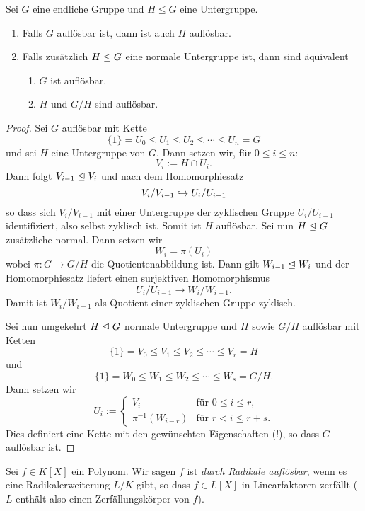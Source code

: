\documentclass{book}
\begin{document}
\begin{lem}
    \label{lem:auflösbar} Sei $G$ eine endliche Gruppe und $H \le G$ eine Untergruppe. 
    \begin{enumerate}
        \item Falls $G$ auflösbar ist, dann ist auch $H$ auflösbar. 
        \item Falls zusätzlich $H \trianglelefteq G$ eine normale Untergruppe ist, dann sind äquivalent
            \begin{enumerate}[label=(\roman *)]
                \item $G$ ist auflösbar.
                \item $H$ und $G/H$ sind auflösbar. 
            \end{enumerate}
    \end{enumerate}
\end{lem}
\begin{proof}
    Sei $G$ auflösbar mit Kette
    \[
        \{1\} = U_0 \le U_1  \le U_2 \le \cdots \le U_n = G
    \]
    und sei $H$ eine Untergruppe von $G$. 
    Dann setzen wir, für $0 \le i \le n$:
    \[
        V_i := H \cap U_i.
    \]
    Dann folgt $V_{i-1} \trianglelefteq V_{i}$ und nach dem Homomorphiesatz
    \[
        V_i/V_{i-1} \hookrightarrow U_i/U_{i-1} 
    \]
    so dass sich $V_i/V_{i-1}$ mit einer Untergruppe der zyklischen Gruppe
    $U_i/U_{i-1}$ identifiziert, also selbst zyklisch ist. Somit ist $H$
    auflösbar. Sei nun $H \trianglelefteq G$ zusätzliche normal. Dann setzen wir
    \[
        W_i = \pi(U_i)
    \]
    wobei $\pi: G \to G/H$ die Quotientenabbildung ist. Dann gilt $W_{i-1} \trianglelefteq
    W_i$ und der Homomorphiesatz liefert einen surjektiven Homomorphismus
    \[
        U_i/U_{i-1} \to W_i/W_{i-1}.
    \]
    Damit ist $W_i/W_{i-1}$ als Quotient einer zyklischen Gruppe zyklisch. 

    Sei nun umgekehrt $H \trianglelefteq G$ normale Untergruppe und $H$ sowie $G/H$ auflösbar mit Ketten
    \[
        \{1\} = V_0 \le V_1  \le V_2 \le \cdots \le V_r = H
    \]
    und
    \[
        \{1\} = W_0 \le W_1  \le W_2 \le \cdots \le W_s = G/H.
    \]
    Dann setzen wir 
    \[
        U_i := \begin{cases} V_i & \text{für $0 \le i \le r$,}\\
        \pi^{-1}(W_{i-r}) & \text{für $r < i \le r+s$.} \end{cases}
    \]
    Dies definiert eine Kette mit den gewünschten Eigenschaften (!), so dass $G$
    auflösbar ist. 
\end{proof}

\begin{defi}
    \label{defi:radikaleauf}
        Sei $f \in K[X]$ ein Polynom. Wir sagen $f$ ist {\em durch
        Radikale auflösbar}, wenn es eine Radikalerweiterung $L/K$ gibt, so
        dass $f \in L[X]$ in Linearfaktoren zerfällt ($L$ enthält also
        einen Zerfällungskörper von $f$). 
\end{defi}
\end{document}
